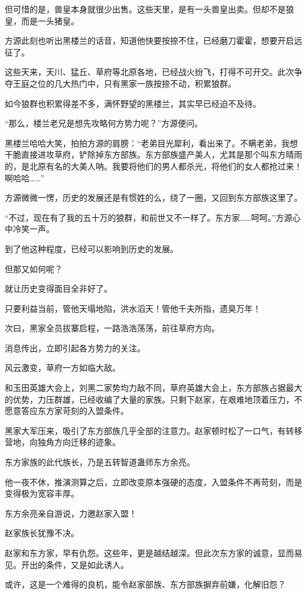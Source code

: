 \begin{this_body}
但可惜的是，兽皇本身就很少出售。这些天里，是有一头兽皇出卖。但却不是狼皇，而是一头猪皇。

方源此刻也听出黑楼兰的话音，知道他快要按捺不住，已经磨刀霍霍，想要开启远征了。

这些天来，天川、猛丘、草府等北原各地，已经战火纷飞，打得不可开交。此次争夺王庭之位的几大热门中，只有黑家一族按捺不动，积累狼群。

如今狼群也积累得差不多，满怀野望的黑楼兰，其实早已经迫不及待。

“那么，楼兰老兄是想先攻略何方势力呢？”方源便问。

黑楼兰哈哈大笑，拍拍方源的肩膀：“老弟目光犀利，看出来了。不瞒老弟，我想干脆直接进攻草府，铲除掉东方部族。东方部族盛产美人，尤其是那个叫东方晴雨的，是北原有名的大美人呐。我要将他们的男人都杀光，将他们的女人都抢过来！啊哈哈……”

方源微微一愣，历史的发展还是有惯姓的么，绕了一圈，又回到东方部族这里了。

“不过，现在有了我的五十万的狼群，和前世又不一样了。东方家……呵呵。”方源心中冷笑一声。

到了他这种程度，已经可以影响到历史的发展。

但那又如何呢？

就让历史变得面目全非好了。

只要利益当前，管他天塌地陷，洪水滔天！管他千夫所指，遗臭万年！

次曰，黑家全员拔寨启程，一路浩浩荡荡，前往草府方向。

消息传出，立即引起各方势力的关注。

风云激变，草府一方如临大敌。

和玉田英雄大会上，刘黑二家势均力敌不同，草府英雄大会上，东方部族占据最大的优势，力压群雄，已经收编了大量的家族。只剩下赵家，在艰难地顶着压力，不愿意答应东方家苛刻的入盟条件。

黑家大军压来，吸引了东方部族几乎全部的注意力。赵家顿时松了一口气，有转移营地，向独角方向迁移的迹象。

东方家族的此代族长，乃是五转智道蛊师东方余亮。

他一夜不休，推演测算之后，立即改变原本强硬的态度，入盟条件不再苛刻，而是变得极为宽容丰厚。

东方余亮亲自游说，力邀赵家入盟！

赵家族长犹豫不决。

赵家和东方家，早有仇怨。这些年，更是越结越深。但此次东方家的诚意，显而易见。开出的条件，又是如此诱人。

或许，这是一个难得的良机，能令赵家部族、东方部族摒弃前嫌，化解旧怨？

\end{this_body}

